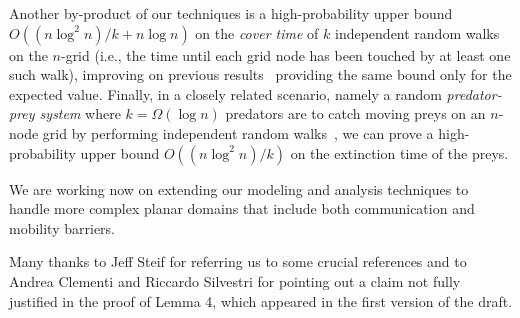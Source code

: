 \documentclass[11pt]{article}
\newcommand{\newterm}[1]{\emph{#1}}
\newcommand{\bigO}[1]{O\left(#1\right)}
\newcommand{\bigOm}[1]{\Omega\left(#1\right)}
\begin{document}
\sloppy Another by-product of our techniques is a high-probability upper bound
$\bigO{(n \log^2 n)/k + n \log n}$ on the
\newterm{cover time} of $k$ independent random walks on the $n$-grid
(i.e., the time until each grid node has been touched by at least one
such walk), improving on previous results~\cite{AlonAKKLT08,
  ElsasserS09} providing the same bound only for the expected
value. Finally, in a closely related scenario, namely a random
\newterm{predator-prey system} where $k = \bigOm{\log n}$ predators
are to catch moving preys on an $n$-node grid by performing independent
random walks~\cite{CooperFR09}, we can prove a
high-probability upper bound $\bigO{(n \log^2 n)/k}$ 
on the extinction time of the preys.

We are working now on extending our modeling and analysis techniques
to handle more complex planar domains that include both communication
and mobility barriers.

Many thanks to Jeff Steif for referring us to some crucial
references and to Andrea Clementi and Riccardo Silvestri for
pointing out a claim not fully justified in the proof of Lemma 4,
which appeared in the first version of the draft.

{}


\end{document}
